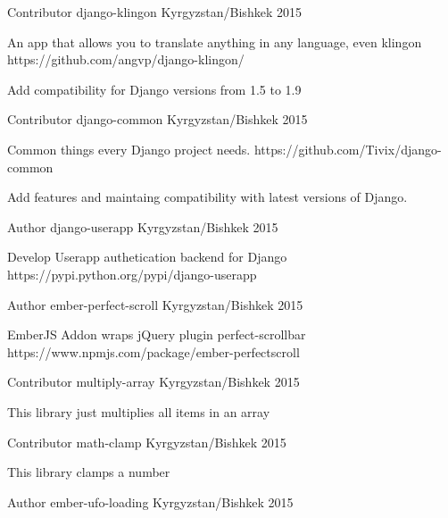 \begin{cventries}
  \cventry
    {Contributor}
    {django-klingon}
    {Kyrgyzstan/Bishkek}
    {2015}
    {
      \begin{cvitems}
        \item {An app that allows you to translate anything in any language, even klingon https://github.com/angvp/django-klingon/}
        \item {Add compatibility for Django versions from 1.5 to 1.9}
      \end{cvitems}
    }
  \cventry
    {Contributor}
    {django-common}
    {Kyrgyzstan/Bishkek}
    {2015}
    {
      \begin{cvitems}
        \item {Common things every Django project needs. https://github.com/Tivix/django-common}
        \item {Add features and maintaing compatibility with latest versions of Django.}
      \end{cvitems}
    }
  \cventry
    {Author}
    {django-userapp}
    {Kyrgyzstan/Bishkek}
    {2015}
    {
      \begin{cvitems}
        \item {Develop Userapp authetication backend for Django https://pypi.python.org/pypi/django-userapp}
      \end{cvitems}
    }
  \cventry
    {Author}
    {ember-perfect-scroll}
    {Kyrgyzstan/Bishkek}
    {2015}
    {
      \begin{cvitems}
        \item {EmberJS Addon wraps jQuery plugin perfect-scrollbar https://www.npmjs.com/package/ember-perfectscroll}
      \end{cvitems}
    }
  \cventry
    {Contributor}
    {multiply-array}
    {Kyrgyzstan/Bishkek}
    {2015}
    {
      \begin{cvitems}
        \item {This library just multiplies all items in an array}
      \end{cvitems}
    }
  \cventry
    {Contributor}
    {math-clamp}
    {Kyrgyzstan/Bishkek}
    {2015}
    {
      \begin{cvitems}
        \item {This library clamps a number}
      \end{cvitems}
    }
  \cventry
    {Author}
    {ember-ufo-loading}
    {Kyrgyzstan/Bishkek}
    {2015}
    {
      \begin{cvitems}

\end{cvitems}}
\end{cventries}
